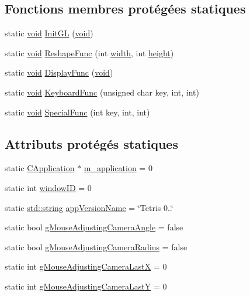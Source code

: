 \subsection*{Fonctions membres protégées statiques}
\begin{DoxyCompactItemize}
\item 
static \hyperlink{glu_8h_a4292190e3f1f6b373a760c7d9316ad3c}{void} \hyperlink{class_c_gui_glut_adb22d019a77d1aad91540f68357588d3}{Init\-G\-L} (\hyperlink{glu_8h_a4292190e3f1f6b373a760c7d9316ad3c}{void})
\item 
static \hyperlink{glu_8h_a4292190e3f1f6b373a760c7d9316ad3c}{void} \hyperlink{class_c_gui_glut_a4eca507ba68303bf022cf403d8e399ed}{Reshape\-Func} (int \hyperlink{gl_8h_a30a197eaed803ac3cd1b444d4c972354}{width}, int \hyperlink{gl_8h_aab021b2df174b06135ca6744356dcf34}{height})
\item 
static \hyperlink{glu_8h_a4292190e3f1f6b373a760c7d9316ad3c}{void} \hyperlink{class_c_gui_glut_a8fe1811c9e5893602d07c31093e6aba2}{Display\-Func} (\hyperlink{glu_8h_a4292190e3f1f6b373a760c7d9316ad3c}{void})
\item 
static \hyperlink{glu_8h_a4292190e3f1f6b373a760c7d9316ad3c}{void} \hyperlink{class_c_gui_glut_a51ac7b3fa2a2ebff359678451ae92332}{Keyboard\-Func} (unsigned char key, int, int)
\item 
static \hyperlink{glu_8h_a4292190e3f1f6b373a760c7d9316ad3c}{void} \hyperlink{class_c_gui_glut_a841c450eb681af1c986dd68004bbb7fe}{Special\-Func} (int key, int, int)
\end{DoxyCompactItemize}
\subsection*{Attributs protégés statiques}
\begin{DoxyCompactItemize}
\item 
static \hyperlink{class_c_application}{C\-Application} $\ast$ \hyperlink{class_c_gui_glut_af1cfef33678aad68798ac49e595dcb4a}{m\-\_\-application} = 0
\item 
static int \hyperlink{class_c_gui_glut_a4878717c11f5a307853512a09de37310}{window\-I\-D} = 0
\item 
static \hyperlink{glext_8h_a06b88fc81ad0b30d1512e9609e3d7c82}{std\-::string} \hyperlink{class_c_gui_glut_a12e31814a513a7a045f822caa350327e}{app\-Version\-Name} = \char`\"{}Tetris 0..\char`\"{}
\item 
static bool \hyperlink{class_c_gui_glut_a7ef01c153415d9a8b45cd1a50bf852f2}{g\-Mouse\-Adjusting\-Camera\-Angle} = false
\item 
static bool \hyperlink{class_c_gui_glut_a8d68818a05092a8b55e0ba7003485e3f}{g\-Mouse\-Adjusting\-Camera\-Radius} = false
\item 
static int \hyperlink{class_c_gui_glut_ae55158d240b75d6bceee346e0155de84}{g\-Mouse\-Adjusting\-Camera\-Last\-X} = 0
\item 
static int \hyperlink{class_c_gui_glut_a24c5393cda1ad9cb013ba13f43fc4a25}{g\-Mouse\-Adjusting\-Camera\-Last\-Y} = 0
\end{DoxyCompactItemize}



